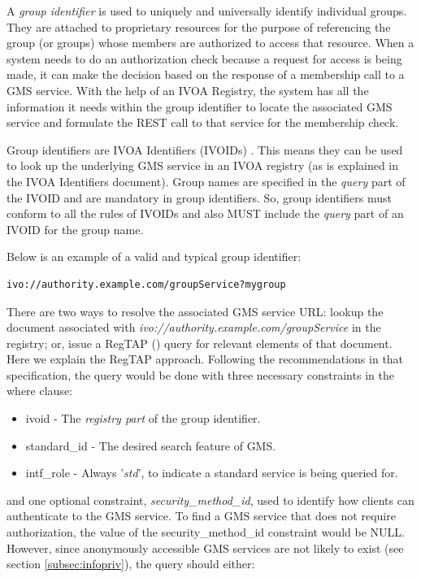 \documentclass[11pt,a4paper]{ivoa}
\begin{document}
A \emph{group identifier} is used to uniquely and universally identify individual groups.  They are attached to proprietary resources for the purpose of referencing the group (or groups) whose members are authorized to access that resource.  When a system needs to do an authorization check because a request for access is being made, it can make the decision based on the response of a membership call to a GMS service.  With the help of an IVOA Registry, the system has all the information it needs within the group identifier to locate the associated GMS service and formulate the REST call to that service for the membership check.

Group identifiers are IVOA Identifiers (IVOIDs) \citep{2016ivoa.spec.0523D}.  This means they can be used to look up the underlying GMS service in an IVOA registry (as is explained in the IVOA Identifiers document).  Group names are specified in the \emph{query} part of the IVOID and are mandatory in group identifiers.  So, group identifiers must conform to all the rules of IVOIDs and also MUST include the \emph{query} part of an IVOID for the group name.

Below is an example of a valid and typical group identifier:

\begin{verbatim}
ivo://authority.example.com/groupService?mygroup
\end{verbatim}

There are two ways to resolve the associated GMS service URL:  lookup the document associated with \emph{ivo://authority.example.com/groupService} in the registry; or, issue a RegTAP (\citep{2014ivoa.spec.1208D}) query for relevant elements of that document.  Here we explain the RegTAP approach.  Following the recommendations in that specification, the query would be done with three necessary constraints in the where clause:
\begin{itemize}
\item{ivoid} - The \emph{registry part} of the group identifier.
\item{standard\_id} - The desired search feature of GMS.
\item{intf\_role} - Always '\emph{std}', to indicate a standard service is being queried for.
\end{itemize}

and one optional constraint, \emph{security\_method\_id}, used to identify how clients can authenticate to the GMS service.  To find a GMS service that does not require authorization, the value of the security\_method\_id constraint would be NULL.  However, since anonymously accessible GMS services are not likely to exist (see section \ref{subsec:infopriv}), the query should either:
\end{document}
